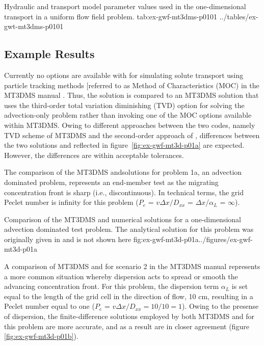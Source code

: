 \begin{StandardTable}
	{Hydraulic and transport model parameter values used in the one-dimensional transport in a uniform flow field problem.}
	{tab:ex-gwf-mt3dms-p0101}
	{../tables/ex-gwt-mt3dms-p0101}
\end{StandardTable}

\subsection{Example Results}

Currently no options are available with \mf for simulating solute transport using particle tracking methods [referred to as Method of Characteristics (MOC) in the MT3DMS manual \cite{zheng1999mt3dms}.  Thus, the \mf solution is compared to an MT3DMS solution that uses the third-order total variation diminishing (TVD) option for solving the advection-only problem rather than invoking one of the MOC options available within MT3DMS.  Owing to different approaches between the two codes, namely TVD scheme of  MT3DMS and the second-order approach of \mf, differences between the two solutions and reflected in figure~\ref{fig:ex-gwf-mt3d-p01a} are expected.  However, the differences are within acceptable tolerances.

The comparison of the MT3DMS and\mf solutions for problem 1a, an advection dominated problem, represents an end-member test as the migrating concentration front is sharp (i.e., discontinuous). In technical terms, the grid Peclet number is infinity for this problem ($P_e$ = $v\Delta x/D_{xx}$ = $\Delta x$/$\alpha_L$ = $\infty$).

\begin{StandardFigure}
	{Comparison of the MT3DMS and \mf numerical solutions for a one-dimensional advection dominated test problem.  The analytical solution for this problem was originally given in \cite{vanGenuchtenAlves1982} and is not shown here}
	{fig:ex-gwf-mt3d-p01a}{../figures/ex-gwf-mt3d-p01a}
\end{StandardFigure}

A comparison of MT3DMS and \mf for scenario 2 in the MT3DMS manual represents a more common situation whereby dispersion acts to spread or smooth the advancing concentration front.  For this problem, the dispersion term $\alpha_L$ is set equal to the length of the grid cell in the direction of flow, 10 cm, resulting in a Peclet number equal to one ($P_e$ = $v\Delta x/D_{xx} = 10/10 = 1$).  Owing to the presense of dispersion, the finite-difference solutions employed by both MT3DMS and \mf for this problem are more accurate, and as a result are in closer agreement (figure \ref{fig:ex-gwf-mt3d-p01b}).

